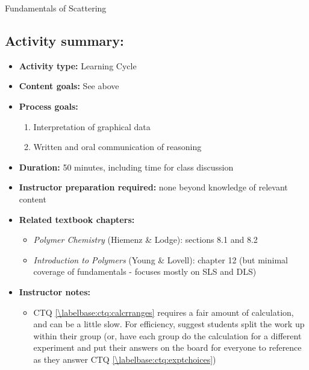 \begin{activity}{Fundamentals of Scattering}
\begin{instructornotes}
	\subsection*{Activity summary:}
	\begin{itemize}
		\item \textbf{Activity type:} Learning Cycle
		\item \textbf{Content goals:} See above
		\item \textbf{Process goals:} %
			\begin{enumerate}
				\item Interpretation of graphical data
				\item Written and oral communication of reasoning
			\end{enumerate}
		\item \textbf{Duration:} 50 minutes, including time for class discussion
		\item \textbf{Instructor preparation required:} none beyond knowledge of relevant content
		\item \textbf{Related textbook chapters:}
			\begin{itemize}
				\item \emph{Polymer Chemistry} (Hiemenz \& Lodge): sections 8.1 and 8.2
				\item \emph{Introduction to Polymers} (Young \& Lovell): chapter 12 (but minimal coverage of fundamentals - focuses mostly on SLS and DLS)
			\end{itemize}
		\item \textbf{Instructor notes:}
			\begin{itemize}
				\item CTQ \ref{\labelbase:ctq:calcrranges} requires a fair amount of calculation, and can be a little slow.  For efficiency, suggest students split the work up within their group (or, have each group do the calculation for a different experiment and put their answers on the board for everyone to reference as they answer CTQ \ref{\labelbase:ctq:exptchoices})
			\end{itemize}
	\end{itemize}
	
\end{instructornotes}



\begin{model}
	\label{\labelbase:mdl:interference}
	

\end{model}
\end{activity}
